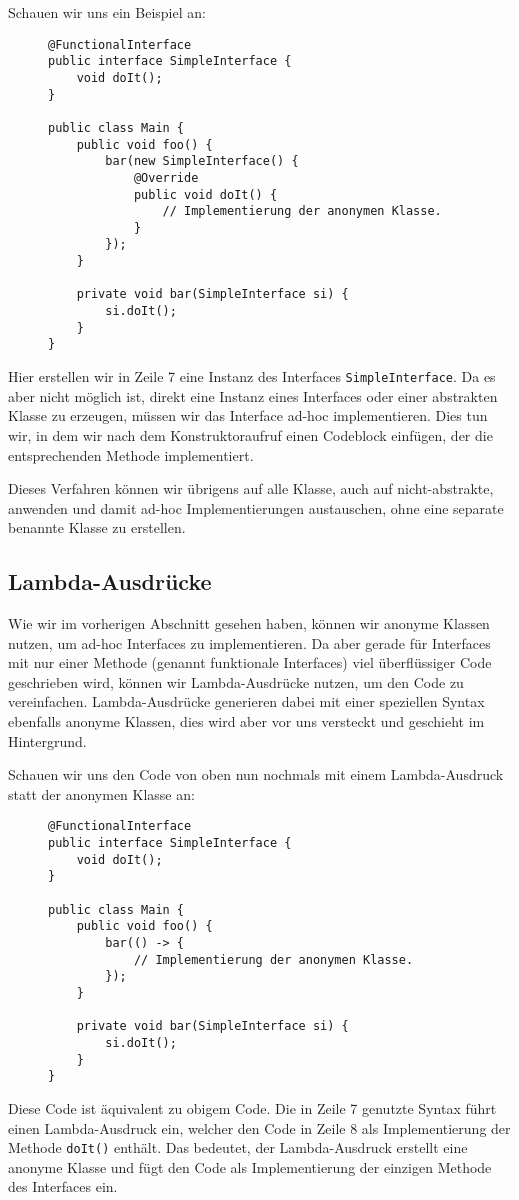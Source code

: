 		Schauen wir uns ein Beispiel an:
		\begin{figure}[H]
			\centering
			\begin{lstlisting}
@FunctionalInterface
public interface SimpleInterface {
	void doIt();
}

public class Main {
	public void foo() {
		bar(new SimpleInterface() {
			@Override
			public void doIt() {
				// Implementierung der anonymen Klasse.
			}
		});
	}

	private void bar(SimpleInterface si) {
		si.doIt();
	}
}
\end{lstlisting}
		\end{figure}
		Hier erstellen wir in Zeile 7 eine Instanz des Interfaces \lstinline|SimpleInterface|. Da es aber nicht möglich ist, direkt eine Instanz eines Interfaces oder einer abstrakten Klasse zu erzeugen, müssen wir das Interface ad-hoc implementieren. Dies tun wir, in dem wir nach dem Konstruktoraufruf einen Codeblock einfügen, der die entsprechenden Methode implementiert.
		
		Dieses Verfahren können wir übrigens auf alle Klasse, auch auf nicht-abstrakte, anwenden und damit ad-hoc Implementierungen austauschen, ohne eine separate benannte Klasse zu erstellen.

\subsection{Lambda-Ausdrücke}
	\label{sec:lambda}

	Wie wir im vorherigen Abschnitt gesehen haben, können wir anonyme Klassen nutzen, um ad-hoc Interfaces zu implementieren. Da aber gerade für Interfaces mit nur einer Methode (genannt funktionale Interfaces) viel überflüssiger Code geschrieben wird, können wir Lambda-Ausdrücke nutzen, um den Code zu vereinfachen. Lambda-Ausdrücke generieren dabei mit einer speziellen Syntax ebenfalls anonyme Klassen, dies wird aber vor uns versteckt und geschieht im Hintergrund.
	
	Schauen wir uns den Code von oben nun nochmals mit einem Lambda-Ausdruck statt der anonymen Klasse an:
	\begin{figure}[H]
		\centering
		\begin{lstlisting}
@FunctionalInterface
public interface SimpleInterface {
	void doIt();
}

public class Main {
	public void foo() {
		bar(() -> {
			// Implementierung der anonymen Klasse.
		});
	}

	private void bar(SimpleInterface si) {
		si.doIt();
	}
}
\end{lstlisting}
	\end{figure}
	Diese Code ist äquivalent zu obigem Code. Die in Zeile 7 genutzte Syntax führt einen Lambda-Ausdruck ein, welcher den Code in Zeile 8 als Implementierung der Methode \lstinline|doIt()| enthält. Das bedeutet, der Lambda-Ausdruck erstellt eine anonyme Klasse und fügt den Code als Implementierung der einzigen Methode des Interfaces ein.
	
